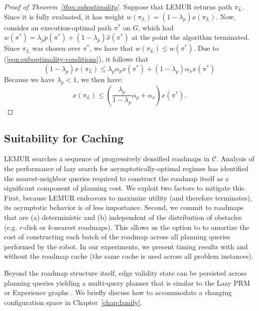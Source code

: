 \begin{proof}[Proof of Theorem~\ref{thm:suboptimality}]
   Suppose that LEMUR returns path $\pi_L$.
   Since it is fully evaluated, it has weight
   $w(\pi_L) = (1\!-\!\lambda_p) x(\pi_L)$.
   Now, consider an execution-optimal path $\pi^*$ on $G$,
   which had
   $w(\pi^*) = \lambda_p \grave{p}(\pi^*) + (1\!-\!\lambda_p) \hat{x}(\pi^*)$
   at the point the algorithm terminated.
   Since $\pi_L$ was chosen over $\pi^*$,
   we have that $w(\pi_L) \leq w(\pi^*)$.
   Due to (\ref{eqn:suboptimality-conditions}),
   it follows that
   \begin{equation}
      (1\!-\!\lambda_p) x(\pi_L)
      \leq
      \lambda_p \alpha_p x(\pi^*) + (1\!-\!\lambda_p) \alpha_x x(\pi^*)
   \end{equation}
   Because we have $\lambda_p < 1$,
   we then have:
   \begin{equation}
      x(\pi_L)
      \leq
      \left( \frac{\lambda_p}{1-\lambda_p} \alpha_p + \alpha_x \right)
      x(\pi^*).
   \end{equation}
\end{proof}

\subsection{Suitability for Caching}

LEMUR searches a sequence of progressively densified roadmaps in
$\mathcal{C}$.
Analysis of the performance of lazy search for asymptotically-optimal
regimes \cite{hauser2015lazy}
has identified the nearest-neighbor queries required to construct
the roadmap itself as a significant component of planning cost.
We exploit two factors to mitigate this.
First,
because LEMUR endeavors to maximize utility (and therefore terminates),
its asymptotic behavior is of less importance.
Second,
we commit to roadmaps that are
(a) deterministic and
(b) independent of the
distribution of obstacles
(e.g. $r$-disk or $k$-nearest roadmaps).
This allows us the option to to amortize the cost of constructing
each batch of the roadmap across all planning queries performed by
the robot.
In our experiments,
we present timing results with and without the roadmap cache
(the same cache is used across all problem instances).

Beyond the roadmap structure itself,
edge validity state can be persisted across planning queries
yielding a multi-query planner
that is similar to the Lazy PRM or
Experience graphs \citep{phillips2012egraphs}.
We briefly discuss how to accommodate a changing configuration space in
Chapter~\ref{chap:family}.

